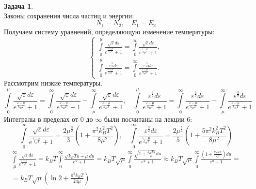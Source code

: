 \documentclass[12pt]{article}
\theoremstyle{definition}
\newtheorem{zad}{Задача}[section]
\begin{document}
\begin{zad}
\begin{equation}
\end{equation}
Законы сохранения числа частиц и энергии:
\begin{equation}
    N_1=N_2,\quad E_1=E_2
\end{equation}
Получаем систему уравнений, определяющую изменение температуры:
\begin{equation}\label{eq6}
    \boxed{\begin{cases}
    \int\limits_0^\mu\frac{\sqrt{\varepsilon}d\varepsilon}{e^{\frac{\varepsilon-\mu}{k_BT}}+1}=\int\limits_0^\infty\frac{\sqrt{\varepsilon}d\varepsilon}{e^{\frac{\varepsilon-\mu'}{k_BT'}}+1},\\ \int\limits_0^\mu\frac{\varepsilon^\frac{3}{2}d\varepsilon}{e^{\frac{\varepsilon-\mu}{k_BT}}+1}=\int\limits_0^\infty\frac{\varepsilon^\frac{3}{2}d\varepsilon}{e^{\frac{\varepsilon-\mu'}{k_BT'}}+1}.
    \end{cases}}
\end{equation}
Рассмотрим низкие температуры.
\begin{equation}
    \int\limits_0^\mu\frac{\sqrt{\varepsilon}d\varepsilon}{e^{\frac{\varepsilon-\mu}{k_BT}}+1}=\int\limits_0^\infty\frac{\sqrt{\varepsilon}d\varepsilon}{e^{\frac{\varepsilon-\mu}{k_BT}}+1}-\int\limits_\mu^\infty\frac{\sqrt{\varepsilon}d\varepsilon}{e^{\frac{\varepsilon-\mu}{k_BT}}+1},\quad \int\limits_0^\mu\frac{\varepsilon^\frac{3}{2}d\varepsilon}{e^{\frac{\varepsilon-\mu}{k_BT}}+1}=\int\limits_0^\infty\frac{\varepsilon^\frac{3}{2}d\varepsilon}{e^{\frac{\varepsilon-\mu}{k_BT}}+1}-\int\limits_\mu^\infty\frac{\varepsilon^\frac{3}{2}d\varepsilon}{e^{\frac{\varepsilon-\mu}{k_BT}}+1}
\end{equation}
Интегралы в пределах от $0$ до $\infty$ были посчитаны на лекции 6:
\begin{equation}
    \int\limits_0^\infty\frac{\sqrt{\varepsilon}d\varepsilon}{e^{\frac{\varepsilon-\mu}{k_BT}}+1}=\frac{2\mu^\frac{3}{2}}{3}\left(1+\frac{\pi^2k_B^2T^2}{8\mu^2}\right),\quad \int\limits_0^\infty\frac{\varepsilon^{\frac{3}{2}}d\varepsilon}{e^{\frac{\varepsilon-\mu}{k_BT}}+1}=\frac{2\mu^\frac{5}{2}}{5}\left(1+\frac{5\pi^2k_B^2T^2}{8\mu^2}\right)
\end{equation}
\begin{multline}
    \int\limits_\mu^\infty\frac{\sqrt{\varepsilon}d\varepsilon}{e^{\frac{\varepsilon-\mu}{k_BT}}+1}=k_BT\int\limits_0^\infty\frac{\sqrt{k_BTu+\mu}du}{e^u+1}=k_BT\sqrt{\mu}\int\limits_0^\infty\frac{\sqrt{1+\frac{k_BTu}{\mu}}du}{e^u+1}\approx k_BT\sqrt{\mu}\int\limits_0^\infty\frac{\left(1+\frac{k_BTu}{2\mu}\right)du}{e^u+1}=\\=k_BT\sqrt{\mu}\left(\ln2+\frac{\pi^2k_BT}{24\mu}\right)

\end{multline}
\end{zad}
\end{document}
